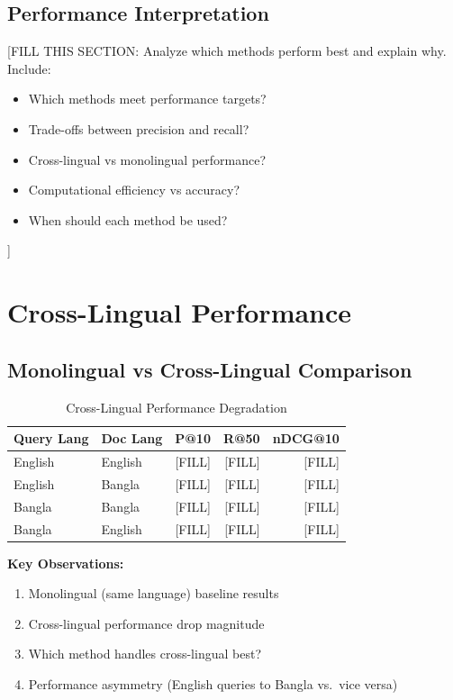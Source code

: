 \documentclass[12pt,a4paper]{report}
\begin{document}
\subsection{Performance Interpretation}

[FILL THIS SECTION: Analyze which methods perform best and explain why. Include:
\begin{itemize}
    \item Which methods meet performance targets?
    \item Trade-offs between precision and recall?
    \item Cross-lingual vs monolingual performance?
    \item Computational efficiency vs accuracy?
    \item When should each method be used?
\end{itemize}
]

\section{Cross-Lingual Performance}

\subsection{Monolingual vs Cross-Lingual Comparison}

\begin{table}[H]
    \centering
    \begin{tabular}{|l|l|r|r|r|}
        \hline
        \textbf{Query Lang} & \textbf{Doc Lang} & \textbf{P@10} & \textbf{R@50} & \textbf{nDCG@10} \\
        \hline
        English & English & [FILL] & [FILL] & [FILL] \\
        \hline
        English & Bangla & [FILL] & [FILL] & [FILL] \\
        \hline
        Bangla & Bangla & [FILL] & [FILL] & [FILL] \\
        \hline
        Bangla & English & [FILL] & [FILL] & [FILL] \\
        \hline
    \end{tabular}
    \caption{Cross-Lingual Performance Degradation}
\end{table}
\textbf{Key Observations:}

\begin{center}
\begin{enumerate}
    \item Monolingual (same language) baseline results
    \item Cross-lingual performance drop magnitude
    \item Which method handles cross-lingual best?
    \item Performance asymmetry (English queries to Bangla vs.\ vice versa)
\end{enumerate}
\end{center}
\end{document}
